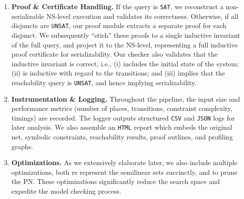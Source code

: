 \begin{enumerate}
	
	\item \textbf{Proof \& Certificate Handling.} If the query is \texttt{SAT}, we reconstruct a non-serializable NS-level execution and validates its correctness. Otherwise, if all disjuncts are \texttt{UNSAT}, our proof module extracts a separate proof for each disjunct. We subsequently ``stich'' these proofs to a single inductive invariant of the full query, and project it to the NS-level, representing a full inductive proof certificate for serializability. Our checker also validates that the inductive invariant is correct, i.e., (i) includes the initial state of the system; (ii) is inductive with regard to the transitions; and (iii) implies that the reachability query is \texttt{UNSAT}, and hence implying serializability. 
	
	
	\item \textbf{Instrumentation \& Logging.} Throughout the pipeline, the input size and performance metrics (number of places, transitions, constraint complexity, timings) are recorded. The logger outputs structured \texttt{CSV} and \texttt{JSON} logs for later analysis. 
	We also assemble an \texttt{HTML} report which embeds the original net, symbolic constraints, reachability results, proof outlines, and profiling graphs.
	
	
	\item \textbf{Optimizations.} As we extensively elaborate later, we also include multiple optimizations, both re represent the semilinear sets succinctly, and to prune the PN. These optimizations significantly reduce the search space and expedite the model checking process.
\end{enumerate}





